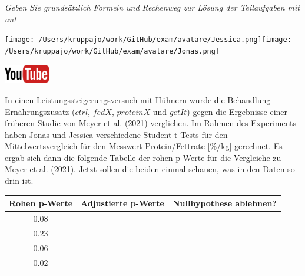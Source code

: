 \documentclass[a4paper, 9pt]{scrartcl}\usepackage[]{graphicx}\usepackage[]{xcolor}
\newenvironment{knitrout}{}{} %
\begin{document}
\textit{Geben Sie grundsätzlich Formeln und Rechenweg zur Lösung der Teilaufgaben mit an!} \\[1Ex]
 

 
\begin{minipage}[t]{0.5\textwidth}
\texttt{[image: /Users/kruppajo/work/GitHub/exam/avatare/Jessica.png]}\hspace{-4mm}\texttt{[image: /Users/kruppajo/work/GitHub/exam/avatare/Jonas.png]}
\end{minipage}
\begin{minipage}[t]{0.5\textwidth}
\hfill
\href{https://youtu.be/kHmfEmU6lrk}{\includegraphics[width = 2cm]{img/youtube}}
\end{minipage}
\vspace{1ex}



In einen Leistungssteigerungsversuch mit Hühnern wurde die Behandlung Ernährungszusatz ($ctrl$, $fedX$, $proteinX$ und $getIt$) gegen die Ergebnisse einer früheren Studie von Meyer et al. (2021) verglichen. Im Rahmen des Experiments haben Jonas und Jessica verschiedene Student t-Tests für den Mittelwertsvergleich für den Messwert Protein/Fettrate [\%/kg] gerechnet. Es ergab sich dann die folgende Tabelle der rohen p-Werte für die Vergleiche zu Meyer et al. (2021). Jetzt sollen die beiden einmal schauen, was in den Daten so drin ist.

\begin{knitrout}
\color{fgcolor}\begin{table}[!h]
\centering\begingroup\fontsize{10}{12}\selectfont

\begin{tabular}{ccc}
\toprule
\textbf{Rohen p-Werte} & \textbf{Adjustierte p-Werte} & \textbf{Nullhypothese ablehnen?}\\
\midrule
0.08 &  & \\
0.23 &  & \\
0.06 &  & \\
0.02 &  & \\
\bottomrule
\end{tabular}
\endgroup{}
\end{table}

\end{knitrout}
\end{document}
